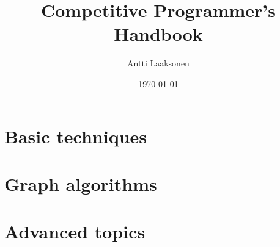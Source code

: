 \documentclass[twoside,12pt,a4paper,english]{book}
\date{\Large \today}
\title{\Huge Competitive Programmer's Handbook}
\author{\Large Antti Laaksonen}
\begin{document}


\frontmatter
\maketitle
\setcounter{tocdepth}{1}
\tableofcontents



\mainmatter
{}
\setcounter{page}{1}

\newcommand{\key}[1] {\textbf{#1}}

\part{Basic techniques}



% 
% 
% 
% 
% 
% 
% 
\part{Graph algorithms}
% 
% 
% 
% 
% 
% 
% 
% 
% 
% 
\part{Advanced topics}
% 
% 
% 
% 
% 
% 
% 
% 
% 
% 
% 

\cleardoublepage
\printindex
\end{document}
